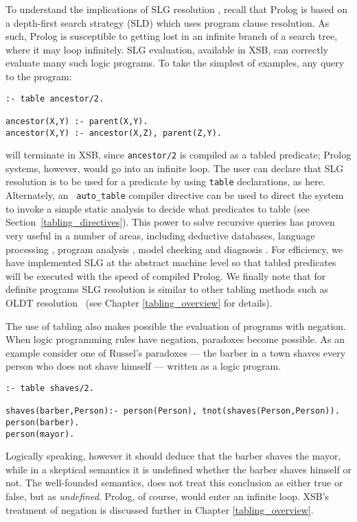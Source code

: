 To understand the implications of SLG resolution \cite{ChWa96}, recall
that Prolog is based on a depth-first search strategy (SLD) which uses
program clause resolution.  As such, Prolog is susceptible to getting
lost in an infinite branch of a search tree, where it may loop
infinitely.  SLG evaluation, available in XSB, can correctly evaluate
many such logic programs.  To take the simplest of examples, any query
to the program:
\begin{center}
\begin{minipage}{3.8in}
\begin{verbatim}
:- table ancestor/2.

ancestor(X,Y) :- parent(X,Y).
ancestor(X,Y) :- ancestor(X,Z), parent(Z,Y).
\end{verbatim}
\end{minipage}
\end{center}
will terminate in XSB, since {\tt ancestor/2} is compiled as a tabled
predicate; Prolog systems, however, would go into an infinite loop.
The user can declare that SLG resolution is to be used for a predicate
by using {\tt table} declarations, as here.  Alternately, an {\tt
auto\_table} compiler directive can be used to direct the system to
invoke a simple static analysis to decide what predicates to table
(see Section~\ref{tabling_directives}).  This power to solve recursive
queries has proven very useful in a number of areas, including
deductive databases, language processing \cite{syntactica, semantica},
program analysis \cite{DRW96, CoDS96, Boul97}, model checking
\cite{RRRSSW97} and diagnosis \cite{diagnostica}.  For efficiency, we
have implemented SLG at the abstract machine level so that tabled
predicates will be executed with the speed of compiled Prolog.  We
finally note that for definite programs SLG resolution is similar to
other tabling methods such as OLDT resolution~\cite{TaSa86} (see
Chapter
\ref{tabling_overview} for details).

The use of tabling also makes possible the evaluation of programs with
negation.  When logic programming rules have negation, paradoxes
become possible.  As an example consider one of Russel's paradoxes ---
the barber in a town shaves every person who does not shave himself ---
written as a logic program.
\begin{center}
\begin{verbatim} 
:- table shaves/2.

shaves(barber,Person):- person(Person), tnot(shaves(Person,Person)).
person(barber).
person(mayor).
\end{verbatim} 
\end{center}
Logically speaking, however it should deduce that the barber shaves
the mayor, while in a skeptical semantics it is undefined whether the
barber shaves himself or not.  The well-founded semantics, does not
treat this conclusion as either true or false, but as {\em undefined}.
Prolog, of course, would enter an infinite loop.  XSB's treatment of
negation is discussed further in Chapter \ref{tabling_overview}.

